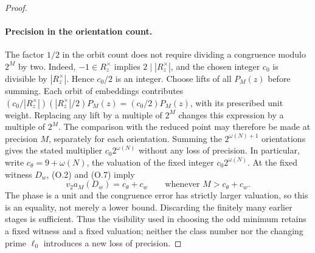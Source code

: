 \documentclass[11pt]{article}
\theoremstyle{definition}
\theoremstyle{remark}
\begin{document}
\begin{proof}
\paragraph{Precision in the orientation count.}
The factor $1/2$ in the orbit count does not require dividing a
congruence modulo $2^M$ by two. Indeed, $-1\in R_z^\times$ implies
$2\mid |R_z^\times|$, and the chosen integer $c_0$ is divisible by
$|R_z^\times|$. Hence $c_0/2$ is an integer. Choose lifts of all
$P_M(z)$ before summing. Each orbit of embeddings contributes
$(c_0/|R_z^\times|)(|R_z^\times|/2)P_M(z)=(c_0/2)P_M(z)$,
with its prescribed unit weight. Replacing any lift by a multiple
of $2^M$ changes this expression by a multiple of $2^M$.
The comparison with the reduced point may therefore be made at
precision $M$, separately for each orientation. Summing the
$2^{\omega(N)+1}$ orientations gives the stated multiplier
$c_0 2^{\omega(N)}$ without any loss of precision.
In particular, write $c_\theta=9+\omega(N)$, the valuation of
the fixed integer $c_0 2^{\omega(N)}$. At the fixed witness $D_w$,
(O.2) and (O.7) imply
\[
 v_2a_M(D_w)=c_\theta+c_w
       \qquad\text{whenever }M>c_\theta+c_w.
\]
The phase is a unit and the congruence error has strictly larger
valuation, so this is an equality, not merely a lower bound.
Discarding the finitely many earlier stages is sufficient. Thus the
visibility used in choosing the odd minimum retains a fixed witness
and a fixed valuation; neither the class number nor the changing
prime $\ell_0$ introduces a new loss of precision.

\end{proof}
\end{document}
